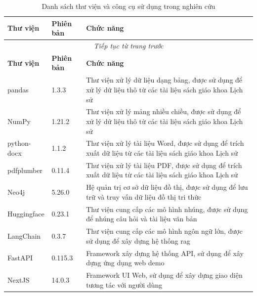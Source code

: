 \begin{longtable}{|p{}|p{}|p{}|}
    \caption{Danh sách thư viện và công cụ sử dụng trong nghiên cứu} \label{tab:libraries}                                                              \\


    \hline
    \textbf{Thư viện} & \textbf{Phiên bản} & \textbf{Chức năng}                                                                                         \\ \hline
    \endfirsthead


    \multicolumn{3}{|c|}{\textit{Tiếp tục từ trang trước}}                                                                                              \\ \hline
    \textbf{Thư viện} & \textbf{Phiên bản} & \textbf{Chức năng}                                                                                         \\ \hline
    \endhead


    \hline
    pandas            & 1.3.3              & Thư viện xử lý dữ liệu dạng bảng, được sử dụng để xử lý dữ liệu thô từ các tài liệu sách giáo khoa Lịch sử \\ \hline
    NumPy             & 1.21.2             & Thư viện xử lý mảng nhiều chiều, được sử dụng để xử lý dữ liệu thô từ các tài liệu sách giáo khoa Lịch sử  \\ \hline
    python-docx       & 1.1.2              & Thư viện xử lý tài liệu Word, được sử dụng để trích xuất dữ liệu từ các tài liệu sách giáo khoa Lịch sử    \\ \hline
    pdfplumber        & 0.11.4             & Thư viện xử lý tài liệu PDF, được sử dụng để trích xuất dữ liệu từ các tài liệu sách giáo khoa Lịch sử     \\ \hline
    Neo4j             & 5.26.0             & Hệ quản trị cơ sở dữ liệu đồ thị, được sử dụng để lưu trữ và truy vấn dữ liệu đồ thị tri thức              \\ \hline
    Huggingface       & 0.23.1             & Thư viện cung cấp các mô hình nhúng, được sử dụng để nhúng câu hỏi và tài liệu văn bản                     \\ \hline
    LangChain         & 0.3.7              & Thư viện cung cấp các mô hình ngôn ngữ lớn, được sử dụng để xây dựng hệ thống \gls{rag}                    \\ \hline
    FastAPI           & 0.115.3            & Framework xây dựng hệ thống API, sử dụng để xây dựng ứng dụng web demo                                     \\ \hline
    NextJS            & 14.0.3             & Framework UI Web, sử dụng để xây dựng giao diện tương tác với người dùng                                   \\ \hline
\end{longtable}




